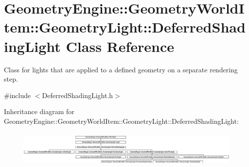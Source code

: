 \hypertarget{class_geometry_engine_1_1_geometry_world_item_1_1_geometry_light_1_1_deferred_shading_light}{}\section{Geometry\+Engine\+::Geometry\+World\+Item\+::Geometry\+Light\+::Deferred\+Shading\+Light Class Reference}
\label{class_geometry_engine_1_1_geometry_world_item_1_1_geometry_light_1_1_deferred_shading_light}


Class for lights that are applied to a defined geometry on a separate rendering step.  




{\ttfamily \#include $<$Deferred\+Shading\+Light.\+h$>$}

Inheritance diagram for Geometry\+Engine\+::Geometry\+World\+Item\+::Geometry\+Light\+::Deferred\+Shading\+Light\+:\begin{figure}[H]
\begin{center}
\leavevmode
\includegraphics[height=1.850220cm]{class_geometry_engine_1_1_geometry_world_item_1_1_geometry_light_1_1_deferred_shading_light}
\end{center}
\end{figure}
